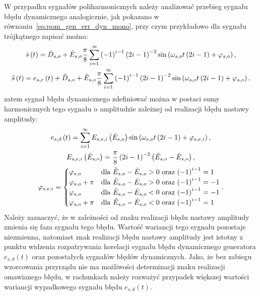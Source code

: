 W przypadku sygnałów poliharmonicznych należy analizować przebieg sygnału błędu dynamicznego analogicznie, jak pokazano w równaniu~\eqref{eq:pom_gen_err_dyn_mono}, przy czym przykładowo dla sygnału trójkątnego zapisać można:
\begin{gather}
\dot{s} \left(t\right) = \dot{D}_{s,o} + \dot{E}_{s,o} \frac{\pi}{8} \sum _{i=1} ^{\infty} \left(-1\right)^{i-1} \left(2i - 1\right)^{-2} \sin \left(\omega_{s,o} t \left(2i - 1\right) + \varphi_{s,o}\right) \label{eq:pom_gen_triangle_ideal}, \\
\tilde{s} \left(t\right) = e_{s,r} \left(t\right) + \tilde{D}_{s,o} + \tilde{E}_{s,o} \frac{\pi}{8} \sum _{i=1} ^{\infty} \left(-1\right)^{i-1} \left(2i - 1\right)^{-2} \sin \left(\omega_{s,o} t \left(2i - 1\right) + \varphi_{s,o}\right) \label{eq:pom_gen_triangle_real},
\end{gather}
zatem sygnał błędu dynamicznego zdefiniować można w postaci sumy harmonicznych tego sygnału o amplitudzie zależnej od realizacji błędu nastawy amplitudy:
\begin{gather}
e_{s,d} \emb{t} = \sum _{i=1} ^{\infty} E_{s,e,i} \emb{\dot{E}_{s,o}} \sin \emb{\omega_{s,o} t \emb{2i - 1} + \varphi_{s,e,i}} \label{eq:pom_gen_err_dyn_triangle}, \\
E_{s,e,i} \emb{\dot{E}_{s,o}} = \frac{\pi}{8} \emb{2i - 1}^{-2} \emb{\tilde{E}_{s,o} - \dot{E}_{s,o}} \label{eq:pom_gen_err_amp_triangle}, \\
\varphi_{s,e,i} =
\begin{cases}
\varphi_{s,o}       & $dla $ \tilde{E}_{s,o} - \dot{E}_{s,o} > 0 $ oraz $ \emb{-1}^{i-1} =  1 \\
\varphi_{s,o} + \pi & $dla $ \tilde{E}_{s,o} - \dot{E}_{s,o} > 0 $ oraz $ \emb{-1}^{i-1} = -1 \\
\varphi_{s,o}       & $dla $ \tilde{E}_{s,o} - \dot{E}_{s,o} < 0 $ oraz $ \emb{-1}^{i-1} = -1 \\
\varphi_{s,o} + \pi & $dla $ \tilde{E}_{s,o} - \dot{E}_{s,o} < 0 $ oraz $ \emb{-1}^{i-1} =  1
\end{cases}
\label{eq:pom_gen_err_phi_triangle}.
\end{gather}
Należy zaznaczyć, że w zależności od znaku realizacji błędu nastawy amplitudy zmienia się faza sygnału tego błędu. Wartość wariancji tego sygnału pozostaje niezmienna, natomiast znak realizacji błędu nastawy amplitudy jest istotny z punktu widzenia rozpatrywania korelacji sygnału błędu dynamicznego generatora $e_{s,d}(t)$ oraz pozostałych sygnałów błędów dynamicznych. Jako, że bez zabiegu wzorcowania przyrządu nie ma możliwości determinacji znaku realizacji omawianego błędu, w rachunkach należy rozważyć przypadek większej wartości wariancji wypadkowego sygnału błędu $e_{s,d}(t)$.

